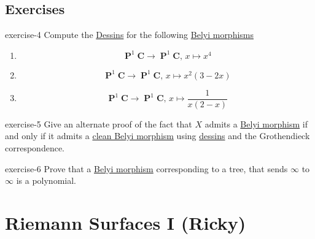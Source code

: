 \documentclass[10pt,]{book}
\numberwithin{equation}{section}
\newcommand{\CC}{\mathbf{C}}
\DeclareMathOperator{\PP}{\mathbf{P}}
\begin{document}
\subsection[{Exercises}]{Exercises}\label{subsection-42}
\begin{inlineexercise}{}{exercise-4}%
\hypertarget{p-478}{}%
Compute the \hyperref[def-dessin-denfant]{Dessins} for the following \hyperref[def-belyi-morphism]{Belyi morphisms}\leavevmode%
\begin{enumerate}
\item\hypertarget{li-98}{}%
\begin{equation*}
\PP^1\CC\to \PP^1\CC,\,x\mapsto x^4
\end{equation*}
%
\item\hypertarget{li-99}{}%
\begin{equation*}
\PP^1\CC\to \PP^1\CC,\,x\mapsto x^2(3-2x)
\end{equation*}
%
\item\hypertarget{li-100}{}%
\begin{equation*}
\PP^1\CC\to \PP^1\CC,\,x\mapsto \frac{1}{x(2-x)}
\end{equation*}
%
\end{enumerate}
%
\end{inlineexercise}
\begin{inlineexercise}{}{exercise-5}%
\hypertarget{p-479}{}%
Give an alternate proof of the fact that \(X\) admits a \hyperref[def-belyi-morphism]{Belyi morphism} if and only if it admits a \hyperref[def-belyi-morphism]{clean Belyi morphism} using \hyperref[def-dessin-denfant]{dessins} and the Grothendieck correspondence.%
\end{inlineexercise}
\begin{inlineexercise}{}{exercise-6}%
\hypertarget{p-480}{}%
Prove that a \hyperref[def-belyi-morphism]{Belyi morphism} corresponding to a tree, that sends \(\infty\) to \(\infty\) is a polynomial.%
\end{inlineexercise}
%
%
\typeout{************************************************}
\typeout{************************************************}
%
\section[{Riemann Surfaces I (Ricky)}]{Riemann Surfaces I (Ricky)}\label{sec-dessins-riemann-surfaces}
%
%
\typeout{************************************************}
\typeout{************************************************}
%
\end{document}
